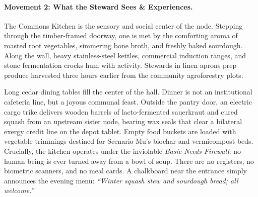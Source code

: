 \paragraph{Movement 2: What the Steward Sees \& Experiences.}
The Commons Kitchen is the sensory and social center of the node. Stepping through the timber-framed doorway, one is met by the comforting aroma of roasted root vegetables, simmering bone broth, and freshly baked sourdough. Along the wall, heavy stainless-steel kettles, commercial induction ranges, and stone fermentation crocks hum with activity. Stewards in linen aprons prep produce harvested three hours earlier from the community agroforestry plots. 

Long cedar dining tables fill the center of the hall. Dinner is not an institutional cafeteria line, but a joyous communal feast. Outside the pantry door, an electric cargo trike delivers wooden barrels of lacto-fermented sauerkraut and cured squash from an upstream sister node, bearing wax seals that clear a bilateral exergy credit line on the depot tablet. Empty food buckets are loaded with vegetable trimmings destined for Scenario Mu's biochar and vermicompost beds. Crucially, the kitchen operates under the inviolable \textit{Basic Needs Firewall}: no human being is ever turned away from a bowl of soup. There are no registers, no biometric scanners, and no meal cards. A chalkboard near the entrance simply announces the evening menu: \textit{``Winter squash stew and sourdough bread; all welcome.''}

